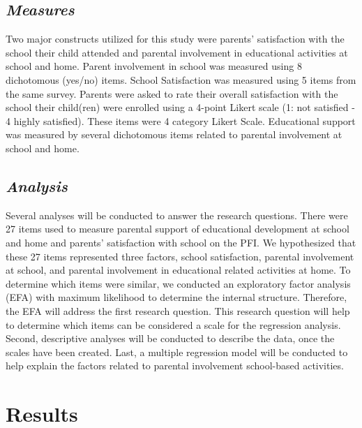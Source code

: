 \documentclass[
  12pt,
]{article}
\begin{document}
\hypertarget{measures}{%
\subsection{\texorpdfstring{\textbf{\emph{Measures}}}{Measures}}\label{measures}}

Two major constructs utilized for this study were parents' satisfaction
with the school their child attended and parental involvement in
educational activities at school and home. Parent involvement in school
was measured using 8 dichotomous (yes/no) items. School Satisfaction was
measured using 5 items from the same survey. Parents were asked to rate
their overall satisfaction with the school their child(ren) were
enrolled using a 4-point Likert scale (1: not satisfied - 4 highly
satisfied). These items were 4 category Likert Scale. Educational
support was measured by several dichotomous items related to parental
involvement at school and home.

\hypertarget{analysis}{%
\subsection{\texorpdfstring{\textbf{\emph{Analysis}}}{Analysis}}\label{analysis}}

Several analyses will be conducted to answer the research questions.
There were 27 items used to measure parental support of educational
development at school and home and parents' satisfaction with school on
the PFI. We hypothesized that these 27 items represented three factors,
school satisfaction, parental involvement at school, and parental
involvement in educational related activities at home. To determine
which items were similar, we conducted an exploratory factor analysis
(EFA) with maximum likelihood to determine the internal structure.
Therefore, the EFA will address the first research question. This
research question will help to determine which items can be considered a
scale for the regression analysis. Second, descriptive analyses will be
conducted to describe the data, once the scales have been created. Last,
a multiple regression model will be conducted to help explain the
factors related to parental involvement school-based activities.

\hypertarget{results}{%
\section{\texorpdfstring{\textbf{Results}}{Results}}\label{results}}
\end{document}
